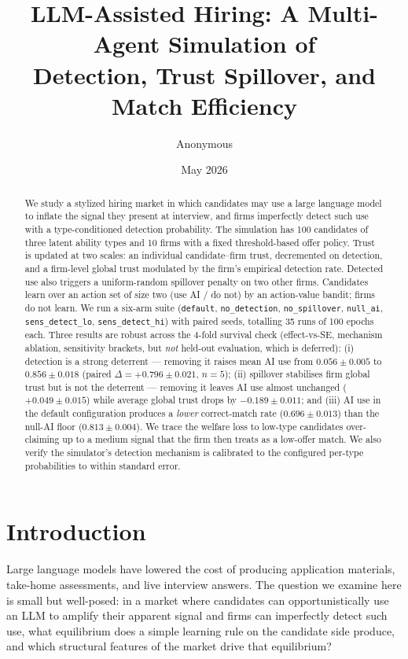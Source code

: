 \documentclass[11pt]{article}
\title{LLM-Assisted Hiring: A Multi-Agent Simulation of\\
       Detection, Trust Spillover, and Match Efficiency}
\author{Anonymous}
\date{May 2026}
\begin{document}
\maketitle

\begin{abstract}
We study a stylized hiring market in which candidates may use a large language model
to inflate the signal they present at interview, and firms imperfectly detect such
use with a type-conditioned detection probability. The simulation has 100 candidates
of three latent ability types and 10 firms with a fixed threshold-based offer policy.
Trust is updated at two scales: an individual candidate--firm trust, decremented
on detection, and a firm-level global trust modulated by the firm's empirical
detection rate. Detected use also triggers a uniform-random spillover penalty
on two other firms. Candidates learn over an action set of size two
(use AI / do not) by an action-value bandit; firms do not learn. We run a six-arm
suite (\texttt{default}, \texttt{no\_detection}, \texttt{no\_spillover},
\texttt{null\_ai}, \texttt{sens\_detect\_lo}, \texttt{sens\_detect\_hi}) with
paired seeds, totalling 35 runs of 100 epochs each. Three results are robust
across the 4-fold survival check (effect-vs-SE, mechanism ablation, sensitivity
brackets, but \emph{not} held-out evaluation, which is deferred): (i) detection
is a strong deterrent --- removing it raises mean AI use from
\(0.056 \pm 0.005\) to \(0.856 \pm 0.018\) (paired \(\Delta = +0.796 \pm 0.021\),
\(n=5\)); (ii) spillover stabilises firm global trust but is not the deterrent
--- removing it leaves AI use almost unchanged (\(+0.049 \pm 0.015\)) while
average global trust drops by \(-0.189 \pm 0.011\); and (iii) AI use in the default
configuration produces a \emph{lower} correct-match rate (\(0.696 \pm 0.013\))
than the null-AI floor (\(0.813 \pm 0.004\)). We trace the welfare loss to
low-type candidates over-claiming up to a medium signal that the firm then
treats as a low-offer match. We also verify the simulator's detection mechanism
is calibrated to the configured per-type probabilities to within standard error.
\end{abstract}

\section{Introduction}

Large language models have lowered the cost of producing application materials,
take-home assessments, and live interview answers. The question we examine here
is small but well-posed: in a market where candidates can opportunistically use
an LLM to amplify their apparent signal and firms can imperfectly detect such use,
what equilibrium does a simple learning rule on the candidate side produce, and
which structural features of the market drive that equilibrium?
\end{document}
